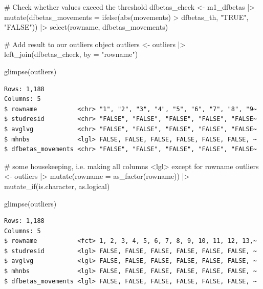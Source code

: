 \documentclass[
  letterpaper,
  DIV=11,
  numbers=noendperiod]{scrreprt}
\newenvironment{Shaded}{\begin{snugshade}}{\end{snugshade}}
\newcommand{\AttributeTok}[1]{\textcolor[rgb]{0.40,0.45,0.13}{#1}}
\newcommand{\CommentTok}[1]{\textcolor[rgb]{0.37,0.37,0.37}{#1}}
\newcommand{\FunctionTok}[1]{\textcolor[rgb]{0.28,0.35,0.67}{#1}}
\newcommand{\NormalTok}[1]{\textcolor[rgb]{0.00,0.23,0.31}{#1}}
\newcommand{\OtherTok}[1]{\textcolor[rgb]{0.00,0.23,0.31}{#1}}
\newcommand{\SpecialCharTok}[1]{\textcolor[rgb]{0.37,0.37,0.37}{#1}}
\newcommand{\StringTok}[1]{\textcolor[rgb]{0.13,0.47,0.30}{#1}}
\begin{document}
\begin{Shaded}
\begin{Highlighting}[]
\CommentTok{\# Check whether values exceed the threshold}
\NormalTok{dfbetas\_check }\OtherTok{\textless{}{-}}
\NormalTok{  m1\_dfbetas }\SpecialCharTok{|\textgreater{}}
  \FunctionTok{mutate}\NormalTok{(}\AttributeTok{dfbetas\_movements =} \FunctionTok{ifelse}\NormalTok{(}\FunctionTok{abs}\NormalTok{(movements) }\SpecialCharTok{\textgreater{}}\NormalTok{ dfbetas\_th,}
                                \StringTok{"TRUE"}\NormalTok{,}
                                \StringTok{"FALSE"}\NormalTok{)) }\SpecialCharTok{|\textgreater{}}
  \FunctionTok{select}\NormalTok{(rowname, dfbetas\_movements)}

\CommentTok{\# Add result to our outliers object}
\NormalTok{outliers }\OtherTok{\textless{}{-}}
\NormalTok{  outliers }\SpecialCharTok{|\textgreater{}}
  \FunctionTok{left\_join}\NormalTok{(dfbetas\_check, }\AttributeTok{by =} \StringTok{"rowname"}\NormalTok{)}

\FunctionTok{glimpse}\NormalTok{(outliers)}
\end{Highlighting}
\end{Shaded}

\begin{verbatim}
Rows: 1,188
Columns: 5
$ rowname           <chr> "1", "2", "3", "4", "5", "6", "7", "8", "9~
$ studresid         <chr> "FALSE", "FALSE", "FALSE", "FALSE", "FALSE~
$ avglvg            <chr> "FALSE", "FALSE", "FALSE", "FALSE", "FALSE~
$ mhnbs             <lgl> FALSE, FALSE, FALSE, FALSE, FALSE, FALSE, ~
$ dfbetas_movements <chr> "FALSE", "FALSE", "FALSE", "FALSE", "FALSE~
\end{verbatim}

\begin{Shaded}
\begin{Highlighting}[]
\CommentTok{\# some housekeeping, i.e. making all columns \textless{}lgl\textgreater{} except for rowname}
\NormalTok{outliers }\OtherTok{\textless{}{-}}
\NormalTok{  outliers }\SpecialCharTok{|\textgreater{}}
  \FunctionTok{mutate}\NormalTok{(}\AttributeTok{rowname =} \FunctionTok{as\_factor}\NormalTok{(rowname)) }\SpecialCharTok{|\textgreater{}}
  \FunctionTok{mutate\_if}\NormalTok{(is.character, as.logical)}

\FunctionTok{glimpse}\NormalTok{(outliers)}
\end{Highlighting}
\end{Shaded}

\begin{verbatim}
Rows: 1,188
Columns: 5
$ rowname           <fct> 1, 2, 3, 4, 5, 6, 7, 8, 9, 10, 11, 12, 13,~
$ studresid         <lgl> FALSE, FALSE, FALSE, FALSE, FALSE, FALSE, ~
$ avglvg            <lgl> FALSE, FALSE, FALSE, FALSE, FALSE, FALSE, ~
$ mhnbs             <lgl> FALSE, FALSE, FALSE, FALSE, FALSE, FALSE, ~
$ dfbetas_movements <lgl> FALSE, FALSE, FALSE, FALSE, FALSE, FALSE, ~
\end{verbatim}
\end{document}
